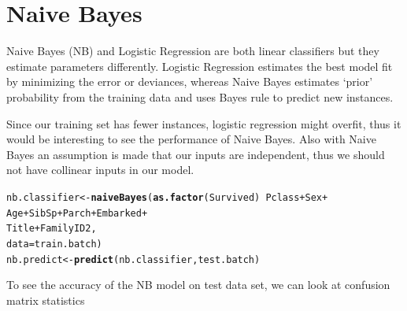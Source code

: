 \documentclass[a4paper,10pt]{report}\usepackage[]{graphicx}\usepackage[]{color}
\makeatletter
\newcommand{\hlopt}[1]{\textcolor[rgb]{0,0,0}{#1}}%
\newcommand{\hlstd}[1]{\textcolor[rgb]{0.345,0.345,0.345}{#1}}%
\newcommand{\hlkwb}[1]{\textcolor[rgb]{0.69,0.353,0.396}{#1}}%
\newcommand{\hlkwc}[1]{\textcolor[rgb]{0.333,0.667,0.333}{#1}}%
\newcommand{\hlkwd}[1]{\textcolor[rgb]{0.737,0.353,0.396}{\textbf{#1}}}%
\newenvironment{kframe}{%
 \def\at@end@of@kframe{}%
 \ifinner\ifhmode%
  \def\at@end@of@kframe{\end{minipage}}%
  \begin{minipage}{\columnwidth}%
 \fi\fi%
 \def\FrameCommand##1{\hskip\@totalleftmargin \hskip-\fboxsep
 \colorbox{shadecolor}{##1}\hskip-\fboxsep
     \hskip-\linewidth \hskip-\@totalleftmargin \hskip\columnwidth}%
 \MakeFramed {\advance\hsize-\width
   \@totalleftmargin\z@ \linewidth\hsize
   \@setminipage}}%
 {\par\unskip\endMakeFramed%
 \at@end@of@kframe}
\newenvironment{knitrout}{}{} %
\makeatother
\begin{document}
\section{Naive Bayes}
Naive Bayes (NB) and Logistic Regression are both linear classifiers but they estimate parameters differently. Logistic Regression estimates the best model fit by minimizing the error or deviances, whereas Naive Bayes estimates `prior' probability from the training data and uses Bayes rule to predict new instances.

Since our training set has fewer instances, logistic regression might overfit, thus it would be interesting to see the performance of Naive Bayes. Also with Naive Bayes an assumption is made that our inputs are independent, thus we should not have collinear inputs in our model.
\begin{knitrout}
\color{fgcolor}\begin{kframe}
\begin{alltt}
\hlstd{nb.classifier} \hlkwb{<-} \hlkwd{naiveBayes}\hlstd{(}\hlkwd{as.factor}\hlstd{(Survived)} \hlopt{~} \hlstd{Pclass} \hlopt{+} \hlstd{Sex} \hlopt{+}
                   \hlstd{Age} \hlopt{+} \hlstd{SibSp} \hlopt{+} \hlstd{Parch} \hlopt{+} \hlstd{Embarked} \hlopt{+}
                   \hlstd{Title} \hlopt{+} \hlstd{FamilyID2,}
                  \hlkwc{data} \hlstd{= train.batch)}
\hlstd{nb.predict} \hlkwb{<-} \hlkwd{predict}\hlstd{(nb.classifier, test.batch)}
\end{alltt}


{\ttfamily\noindent\color{warningcolor}{\#\# Warning: NAs introduced by coercion\\\#\# Warning: NAs introduced by coercion}}\end{kframe}
\end{knitrout}
To see the accuracy of the NB model on test data set, we can look at confusion matrix statistics
\end{document}
